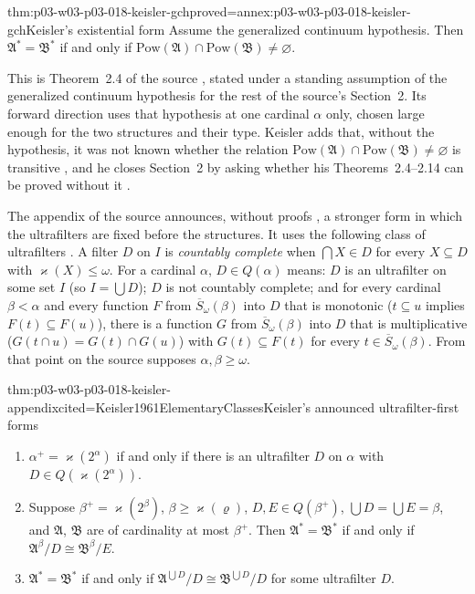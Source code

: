 \begin{hbtheorem}{thm:p03-w03-p03-018-keisler-gch}{proved=annex:p03-w03-p03-018-keisler-gch}{Keisler's existential form}
Assume the generalized continuum hypothesis.  Then
\(\mathfrak A^*=\mathfrak B^*\) if and only if
\(\mathrm{Pow}(\mathfrak A)\cap\mathrm{Pow}(\mathfrak B)\ne\varnothing\).
\end{hbtheorem}

This is Theorem~2.4 of the source \cite[487]{Keisler1961ElementaryClasses}, stated under a
standing assumption of the generalized continuum hypothesis for the rest of
the source's Section~2.  Its forward direction uses that hypothesis at one
cardinal \(\alpha\) only, chosen large enough for the two structures and their
type.  Keisler adds that, without the hypothesis, it was not known whether the
relation \(\mathrm{Pow}(\mathfrak A)\cap\mathrm{Pow}(\mathfrak B)\ne\varnothing\)
is transitive \cite[487]{Keisler1961ElementaryClasses}, and he closes
Section~2 by asking whether his Theorems~2.4--2.14 can be proved without it
\cite[490]{Keisler1961ElementaryClasses}.

The appendix of the source announces, without proofs
\cite[490]{Keisler1961ElementaryClasses}, a stronger form in which the
ultrafilters are fixed before the structures.  It uses the following class of
ultrafilters \cite[491]{Keisler1961ElementaryClasses}.  A filter \(D\) on
\(I\) is \emph{countably complete} when \(\bigcap X\in D\) for every
\(X\subseteq D\) with \(\varkappa(X)\le\omega\).  For a cardinal \(\alpha\),
\(D\in Q(\alpha)\) means: \(D\) is an ultrafilter on some set \(I\) (so
\(I=\bigcup D\)); \(D\) is not countably complete; and for every cardinal
\(\beta<\alpha\) and every function \(F\) from \(\overline S_\omega(\beta)\)
into \(D\) that is monotonic (\(t\subseteq u\) implies
\(F(t)\subseteq F(u)\)), there is a function \(G\) from
\(\overline S_\omega(\beta)\) into \(D\) that is multiplicative
(\(G(t\cap u)=G(t)\cap G(u)\)) with \(G(t)\subseteq F(t)\) for every
\(t\in\overline S_\omega(\beta)\).  From that point on the source supposes
\(\alpha,\beta\ge\omega\).

\begin{hbtheorem}{thm:p03-w03-p03-018-keisler-appendix}{cited=Keisler1961ElementaryClasses}{Keisler's announced ultrafilter-first forms}
\begin{enumerate}
  \item \(\alpha^+=\varkappa(2^\alpha)\) if and only if there is an
        ultrafilter \(D\) on \(\alpha\) with \(D\in Q(\varkappa(2^\alpha))\).
  \item Suppose \(\beta^+=\varkappa(2^\beta)\), \(\beta\ge\varkappa(\varrho)\),
        \(D,E\in Q(\beta^+)\), \(\bigcup D=\bigcup E=\beta\), and
        \(\mathfrak A\), \(\mathfrak B\) are of cardinality at most
        \(\beta^+\).  Then \(\mathfrak A^*=\mathfrak B^*\) if and only if
        \(\mathfrak A^\beta/D\cong\mathfrak B^\beta/E\).
  \item \(\mathfrak A^*=\mathfrak B^*\) if and only if
        \(\mathfrak A^{\bigcup D}/D\cong\mathfrak B^{\bigcup D}/D\) for some
        ultrafilter \(D\).
\end{enumerate}
\end{hbtheorem}

